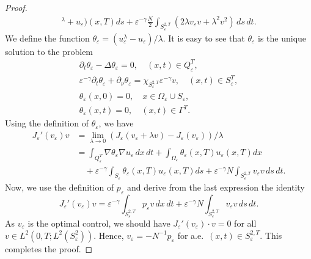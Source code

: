 \documentclass[reqno]{amsart}
\begin{document}
\begin{proof}
\begin{align*}
{ }^{\lambda }+u_{\varepsilon })(x,T){ds}+\varepsilon ^{-\gamma }\frac{N}{2}%
 \int _{S _{\varepsilon }^{2, T}}(2\lambda v_{\varepsilon }v+\lambda
^2v^2)\,ds\,dt.
\end{align*}
We define the function $\theta _{\varepsilon }=(u_{\varepsilon }^{\lambda
}-u_{\varepsilon })/\lambda $. 
It is easy to see that $\theta _{\varepsilon } $ is the unique solution to the problem
\begin{gather*}
\partial _{t}\theta _{\varepsilon }-\Delta \theta _{\varepsilon }=0, \quad
(x,t)\in Q_{\varepsilon }^{T}, \\
\varepsilon ^{-\gamma }\partial _{t}\theta _{\varepsilon }+\partial _{\nu
}\theta _{\varepsilon }=\chi _{S_{\varepsilon }^{2,T}}\varepsilon ^{-\gamma
}v, \quad (x,t)\in S_{\varepsilon }^{T}, \\
\theta _{\varepsilon }(x,0)=0, \quad  x\in \Omega _{\varepsilon }\cup
S_{\varepsilon }, \\
\theta _{\varepsilon }(x,t)=0, \quad (x,t)\in \Gamma ^{T}.%
\end{gather*}
Using the definition of $\theta _{\varepsilon }$, we have
\begin{align*}
J_{\varepsilon }'(v_{\varepsilon })v
&=\lim _{\lambda \to 0}(J_{\varepsilon }(v_{\varepsilon }+\lambda v)-J_{\varepsilon
 }(v_{\varepsilon }))/\lambda  \\
&=\int _{Q_{\varepsilon }^{T}}\nabla \theta _{\varepsilon }\nabla
u_{\varepsilon }\,dx\,dt+\int _{\Omega _{\varepsilon }}\theta
_{\varepsilon }(x,T)u_{\varepsilon }(x,T){dx} \\
&\quad +\varepsilon ^{-\gamma }\int _{S_{\varepsilon }}\theta _{\varepsilon
}(x,T)u_{\varepsilon }(x,T){ds}+\varepsilon ^{-\gamma }N\int
_{S_{\varepsilon }^{2,T}}v_{\varepsilon }v\,ds\,dt.
\end{align*}
Now, we use the definition of $p_{\varepsilon }$ and derive from the last
expression the identity
\[
J_{\varepsilon }'(v_{\varepsilon })v=\varepsilon ^{-\gamma }\int
_{S_{\varepsilon }^{2,T}}p_{\varepsilon }v\,dx\,dt+\varepsilon
^{-\gamma }N\int _{S_{\varepsilon }^{2,T}}v_{\varepsilon }v\,ds\,dt.
\]
As $v_{\varepsilon }$ is the optimal control, we should have
$J_{\varepsilon}'(v_{\varepsilon })\cdot v=0$ for all
$v\in L^2(0,T;L^2(S_{\varepsilon }^2))$. Hence,
$v_{\varepsilon }=-N^{-1}p_{\varepsilon }$ for a.e.\
 $(x,t)\in S_{\varepsilon }^{2,T}$. This
completes the proof.
\end{proof}
\end{document}
